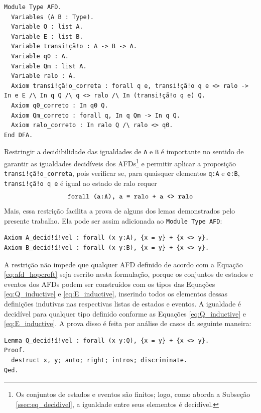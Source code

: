 \begin{verbatim}
Module Type AFD.
  Variables (A B : Type).
  Variable Q : list A.
  Variable E : list B.
  Variable transi!çã!o : A -> B -> A.
  Variable q0 : A.
  Variable Qm : list A.
  Variable ralo : A.
  Axiom transi!çã!o_correta : forall q e, transi!çã!o q e <> ralo -> In e E /\ In q Q /\ q <> ralo /\ In (transi!çã!o q e) Q.
  Axiom q0_correto : In q0 Q.
  Axiom Qm_correto : forall q, In q Qm -> In q Q.
  Axiom ralo_correto : In ralo Q /\ ralo <> q0.
End DFA.
\end{verbatim}

Restringir a decidibilidade das igualdades de \texttt{A} e \texttt{B} é importante no sentido de garantir as igualdades decidíveis dos AFDs\footnote{Os conjuntos de estados e eventos são finitos; logo, como aborda a Subseção \ref{ssec:eq_decidivel}, a igualdade entre seus elementos é decidível.} e permitir aplicar a proposição \texttt{transi!çã!o_correta}, pois verificar se, para quaisquer elementos \texttt{q:A} e \texttt{e:B}, \texttt{transi!çã!o q e} é igual ao estado de ralo requer $$\text{\texttt{forall (a:A), {a = ralo} + {a <> ralo}}}$$ Mais, essa restrição facilita a prova de alguns dos lemas demonstrados pelo presente trabalho. Ela pode ser assim adicionada ao \texttt{Module Type AFD}:

\begin{verbatim}
Axiom A_decid!í!vel : forall (x y:A), {x = y} + {x <> y}.
Axiom B_decid!í!vel : forall (x y:B), {x = y} + {x <> y}.
\end{verbatim}

A restrição não impede que qualquer AFD definido de acordo com a Equação \ref{eq:afd_hopcroft} seja escrito nesta formulação, porque os conjuntos de estados e eventos dos AFDs podem ser construídos com os tipos das Equações \ref{eq:Q_inductive} e \ref{eq:E_inductive}, inserindo todos os elementos dessas definições indutivas nas respectivas listas de estados e eventos. A igualdade é decidível para qualquer tipo definido conforme as Equações \ref{eq:Q_inductive} e \ref{eq:E_inductive}. A prova disso é feita por análise de casos da seguinte maneira:

\begin{verbatim}
Lemma Q_decid!í!vel : forall (x y:Q), {x = y} + {x <> y}.
Proof.
  destruct x, y; auto; right; intros; discriminate.
Qed.
\end{verbatim}

